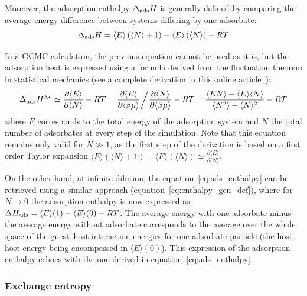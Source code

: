 \documentclass[main.tex]{subfiles}
\begin{document}
Moreover, the adsorption enthalpy $\Delta_{\text{ads}}H$ is generally defined by comparing the average energy difference between systems differing by one adsorbate:
\begin{equation}\label{eq:enthalpy_gen_def}
  \Delta_{\text{ads}}H = \langle E \rangle\left(\langle N \rangle+1\right)-\langle E \rangle\left(\langle N \rangle\right) - RT
\end{equation}

In a GCMC calculation, the previous equation cannot be used as it is, but the adsorption heat is expressed using a formula derived from the fluctuation theorem in statistical mechanics (see a complete derivation in this online article~\autocite{github_simon_gcmc}):
\begin{equation}\label{eq:ads_heat_gcmc}
  \Delta_{\text{ads}}H^{\text{Xe}} \simeq \frac{\partial \langle E \rangle}{\partial \langle N \rangle} - RT = \frac{\partial\langle E \rangle}{\partial\langle \beta\mu \rangle} \bigg/ \frac{\partial \langle N \rangle}{\partial \langle \beta\mu \rangle} - RT = \dfrac{\langle EN \rangle - \langle E \rangle\langle N \rangle}{\langle N^2 \rangle - \langle N \rangle^2} - RT
\end{equation}
where $E$ corresponds to the total energy of the adsorption system and $N$ the total number of adsorbates at every step of the simulation. Note that this equation remains only valid for $N\gg1$, as the first step of the derivation is based on a first order Taylor expansion $\langle E \rangle\left(\langle N \rangle+1\right)-\langle E \rangle\left(\langle N \rangle\right) \simeq \frac{\partial \langle E \rangle}{\partial \langle N \rangle}$. 


On the other hand, at infinite dilution, the equation~\ref{eq:ads_enthalpy} can be retrieved using a similar approach (equation~\ref{eq:enthalpy_gen_def}), where for $N\rightarrow0$ the adsorption enthalpy is now expressed as $\Delta H_{\text{ads}} = \langle E \rangle(1)-\langle E \rangle(0) - RT$. The average energy with one adsorbate minus the average energy without adsorbate corresponds to the average over the whole space of the guest--host interaction energies for one adsorbate particle (the host-host energy being encompassed in $\langle E \rangle(0)$). This expression of the adsorption enthalpy echoes with the one derived in equation~\ref{eq:ads_enthalpy}.

\subsubsection{Exchange entropy}
\end{document}
